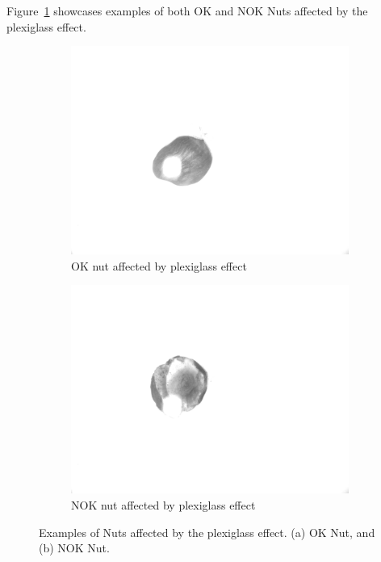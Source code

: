 \documentclass[12pt,DIV14,BCOR12mm,a4paper,footinclude=false,headinclude,parskip=half-,twoside,openright,cleardoublepage=empty,toc=index,bibliography=totoc,listof=totoc]{scrreprt}
\numberwithin{equation}{chapter}
\begin{document}
\begin{enumerate}
	Figure~\ref{fig:plexiglass_effect} showcases examples of both OK and NOK Nuts affected by the plexiglass effect.

	\begin{figure}
		\centering
		\begin{subfigure}[b]{0.45\textwidth}
			\centering
			\includegraphics[scale=0.15]{../media/Nuts-influence-plexiglas-OK.png}
			\caption{OK nut affected by plexiglass effect}
		\end{subfigure}
		\hfill
		\begin{subfigure}[b]{0.45\textwidth}
			\centering
			\includegraphics[scale=0.15]{../media/Nuts-influence-plexiglas-NOK.png}
			\caption{NOK nut affected by plexiglass effect}
		\end{subfigure}
		\caption{Examples of Nuts affected by the plexiglass effect. (a) OK Nut, and (b) NOK Nut.}
		\label{fig:plexiglass_effect}
	\end{figure}
\end{enumerate}
\end{document}
